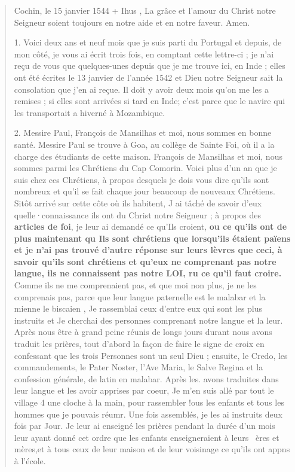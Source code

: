 \begin{quote}
Cochin, le 15 janvier 1544
+
Ihus ,
La grâce et l'amour du Christ notre Seigneur soient toujours en
notre aide et en notre faveur. Amen.


1. Voici deux ans et neuf mois que je suis parti du Portugal et
depuis, de mon côté, je vous ai écrit trois fois, en comptant cette
lettre-ci ; je n'ai reçu de vous que quelques-unes depuis que je me
trouve ici, en Inde ; elles ont été écrites le 13 janvier de l'année
1542 et Dieu notre Seigneur sait la consolation que j'en ai reçue.
Il doit y avoir deux mois qu'on me les a remises ; si elles sont arrivées
si tard en Inde; c'est parce que le navire qui les transportait
a hiverné à Mozambique.


2. Messire Paul, François de Mansilhas et moi, nous sommes en
bonne santé. Messire Paul se trouve à Goa, au collège de Sainte
Foi, où il a la charge des étudiants de cette maison. François de
Mansilhas et moi, nous sommes parmi les Chrétiens du Cap Comorin.
Voici plus d'un an que je suis chez ces Chrétiens, à propos desquels
je dois vous dire qu'ils sont nombreux et qu'il se fait chaque jour
beaucoup de nouveaux Chrétiens. Sitôt arrivé sur cette côte
où ils habitent, J ai tâché de savoir d'eux quelle·connaissance ils
ont du Christ notre Seigneur ; à propos des \textbf{articles de foi}, je leur
ai demandé ce qu'Ils croient, \textbf{ou ce qu'ils ont de plus maintenant
qu Ils sont chrétiens que lorsqu'ils étaient païens et je n'ai pas
trouvé d'autre réponse sur leurs lèvres que ceci, à savoir qu'ils sont
chrétiens et qu'eux ne comprenant pas notre langue, ils ne connaissent
pas notre LOI, ru ce qu'il faut croire.} Comme ils ne me comprenaient
pas, et que moi non plus, je ne les comprenais pas, parce
que leur langue paternelle est le malabar et la mienne le biscaien , Je rassemblai ceux d'entre eux qui sont les plus instruits et
Je cherchai des personnes comprenant notre langue et la leur.
Après nous être à grand peine réunis de longs jours durant nous
avons traduit les prières, tout d'abord la façon de faire le signe de
croix en confessant que les trois Personnes sont un seul Dieu ;
ensuite, le Credo, les commandements, le Pater Noster, l'Ave
Maria, le Salve Regina et la confession générale, de latin en malabar.
Après les. avons traduites dans leur langue et les avoir apprises
par coeur, Je m'en suis allé par tout le village 4 une cloche à la
main, pour rassembler !ous les enfants et tous les hommes que je
pouvais réumr. Une fois assemblés, je les ai instruits deux fois par
Jour. Je leur ai enseigné les prières pendant la durée d'un mois leur
ayant donné cet ordre que les enfants enseigneraient à leurs ~ères
et mères,et à tous ceux de leur maison et de leur voisinage ce qu'ils
ont appns à l'école.


\end{quote}
